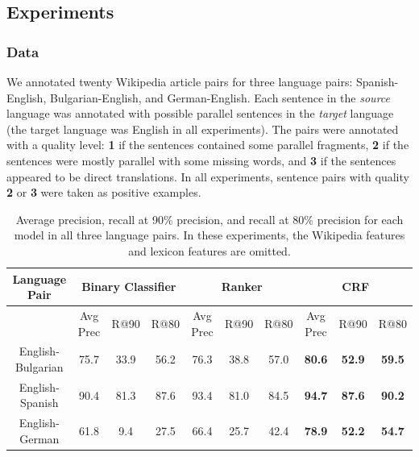 \documentclass[11pt,letterpaper]{article}
\begin{document}
\subsection{Experiments}
\label{sec:exp}

\subsubsection{Data}
We annotated twenty Wikipedia article pairs for three language pairs: Spanish-English,
Bulgarian-English, and German-English.
Each sentence in the {\em source} language was annotated with
possible parallel sentences in the {\em target} language (the target language was
English in all experiments).  The pairs were annotated with a quality level:
{\bf 1} if the sentences contained some parallel fragments, {\bf 2} if the sentences
were mostly parallel with some missing words, and {\bf 3} if the sentences appeared to be direct
translations.  In all experiments, sentence pairs with quality {\bf 2} or {\bf 3} were
taken as positive examples. 

\begin{table}[ht]
\begin{center}
\begin{tabular}{|c||c|c|c||c|c|c||c|c|c|}
\hline
Language Pair     & \multicolumn{3}{|c||}{Binary Classifier} & \multicolumn{3}{|c||}{Ranker} & \multicolumn{3}{|c|}{CRF} \\
\hline
                  & Avg Prec & R@90 & R@80
                  & Avg Prec & R@90 & R@80
                  & Avg Prec & R@90 & R@80 \\
\hline
\footnotesize{English-Bulgarian} & 75.7  & 33.9  & 56.2    & 76.3  & 38.8  & 57.0    & {\bf 80.6}  & {\bf 52.9}  & {\bf 59.5} \\
\footnotesize{English-Spanish}   & 90.4  & 81.3  & 87.6    & 93.4  & 81.0  & 84.5    & {\bf 94.7}  & {\bf 87.6}  & {\bf 90.2} \\
\footnotesize{English-German}    & 61.8  &  9.4  & 27.5    & 66.4  & 25.7  & 42.4    & {\bf 78.9}  & {\bf 52.2}  & {\bf 54.7} \\
\hline
\end{tabular}
\end{center}
\caption{Average precision, recall at 90\% precision, and recall at 80\%
precision for each model in all three language pairs.  In these experiments, the
Wikipedia features and lexicon features are omitted.}
\label{table:modelcompare}
\end{table}
\end{document}
